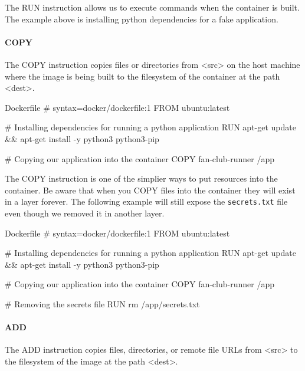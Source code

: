 \documentclass{csse4400}
\begin{document}
The RUN instruction allows us to execute commands when the container is built.
The example above is installing python dependencies for a fake application.

\paragraph{COPY}
The COPY instruction copies files or directories from <src> on the host machine where the image is being built to the filesystem of the container at the path <dest>.

\begin{code}[language=docker,numbers=none]{Dockerfile}
# syntax=docker/dockerfile:1
FROM ubuntu:latest

# Installing dependencies for running a python application
RUN apt-get update && apt-get install -y python3 python3-pip

# Copying our application into the container
COPY fan-club-runner /app
\end{code}

The COPY instruction is one of the simplier ways to put resources into the container.
Be aware that when you COPY files into the container they will exist in a layer forever.
The following example will still expose the \texttt{secrets.txt} file even though we removed it in another layer.

\begin{code}[language=docker,numbers=none]{Dockerfile}
# syntax=docker/dockerfile:1
FROM ubuntu:latest

# Installing dependencies for running a python application
RUN apt-get update && apt-get install -y python3 python3-pip

# Copying our application into the container
COPY fan-club-runner /app

# Removing the secrets file
RUN rm /app/secrets.txt
\end{code}

\paragraph{ADD}
The ADD instruction copies files, directories, or remote file URLs from <src> to the filesystem of the image at the path <dest>.
\end{document}
